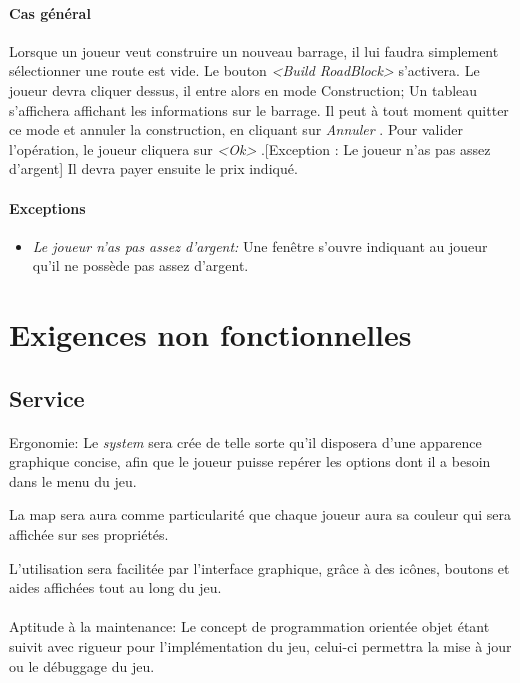 \documentclass[a4paper,11pt]{report}
\begin{document}
\paragraph{Cas général}
Lorsque un joueur veut construire un nouveau barrage, il lui faudra simplement sélectionner une route est vide. Le bouton \og \textit{<Build RoadBlock>} \fg s'activera. Le joueur devra cliquer dessus, il entre alors en mode Construction; Un tableau s'affichera affichant les informations sur le barrage. Il peut à tout moment quitter ce mode et annuler la construction, en cliquant sur \og \textit{Annuler} \fg. Pour valider l'opération, le joueur cliquera sur \og \textit{<Ok>} \fg.[Exception : Le joueur n'as pas assez d'argent] Il devra payer ensuite le prix indiqué.
\paragraph{Exceptions}
\begin{itemize}
	\item \textit{Le joueur n'as pas assez d'argent:}  Une fenêtre s'ouvre indiquant au joueur qu'il ne possède pas assez d'argent.
\end{itemize}




\newpage
\section{Exigences non fonctionnelles}
\subsection{Service}
\paragraph{}Ergonomie:  \newline
Le \textit{system} sera crée de telle sorte qu'il disposera d’une apparence graphique concise, afin que le joueur puisse repérer les options dont il a besoin dans le menu du jeu.

La map sera aura comme particularité que chaque joueur aura sa couleur qui sera affichée sur ses propriétés.

L'utilisation sera facilitée par l'interface graphique, grâce à des icônes, boutons et aides affichées tout au long du jeu.

\paragraph{}Aptitude à la maintenance:  \newline
Le concept de programmation orientée objet étant suivit avec rigueur pour l’implémentation du jeu, celui-ci permettra la mise à jour ou le débuggage du jeu.
\end{document}
